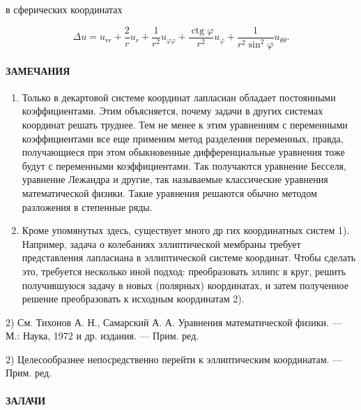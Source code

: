 \documentclass[
  ukrainian,
]{article}
\begin{document}
в сферических координатах

\[
\Delta u = u_{rr} + \frac{2}{r} u_r + \frac{1}{r^2} u_{\varphi\varphi} + \frac{\operatorname{ctg} \varphi}{r^2} u_{\varphi} + \frac{1}{r^2 \sin^2 \varphi} u_{\theta\theta}.
\]

\paragraph{ЗАМЕЧАНИЯ}\label{ux437ux430ux43cux435ux447ux430ux43dux438ux44f-7}

\begin{enumerate}
\def\labelenumi{\arabic{enumi}.}
\item
  Только в декартовой системе координат лапласиан обладает постоянными
  коэффициентами. Этим объясняется, почему задачи в других системах
  координат решать труднее. Тем не менее к этим уравнениям с переменными
  коэффициентами все еще применим метод разделения переменных, правда,
  получающиеся при этом обыкновенные дифференциальные уравнения тоже
  будут с переменными коэффициентами. Так получаются уравнение Бесселя,
  уравнение Лежандра и другие, так называемые классические уравнения
  математической физики. Такие уравнения решаются обычно методом
  разложения в степенные ряды.
\item
  Кроме упомянутых здесь, существует много др гих координатных систем
  1). Например, задача о колебаниях эллиптической мембраны требует
  представления лапласиана в эллиптической системе координат. Чтобы
  сделать это, требуется несколько иной подход: преобразовать эллипс в
  круг, решить получившуюся задачу в новых (полярных) координатах, и
  затем полученное решение преобразовать к исходным координатам 2).
\end{enumerate}

2) См. Тихонов А. Н., Самарский А. А. Уравнения математической физики.
--- М.: Наука, 1972 и др. издания. --- Прим. ред.

2) Целесообразнее непосредственно перейти к эллиптическим координатам.
--- Прим. ред.

\paragraph{ЗАЛАЧИ}\label{ux437ux430ux43bux430ux447ux438}
\end{document}
